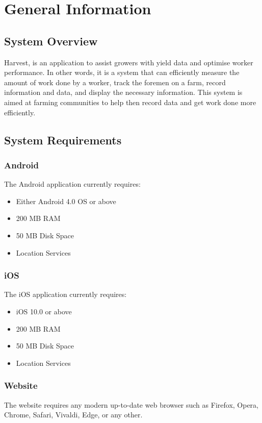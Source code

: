 \documentclass[11pt]{article}
\begin{document}
\newpage
{}
\tableofcontents
\newpage
\listoffigures

\newpage
{}

\section{General Information}
\subsection{System Overview}
Harvest, is an application to assist growers with yield data and optimise worker performance. In other words, it is a system that can efficiently measure the amount of work done by a worker, track the foremen on a farm, record information and data, and display the necessary information. This system is aimed at farming communities to help then record data and get work done more efficiently.

\subsection{System Requirements}
\subsubsection{Android}
The Android application currently requires:
\begin{itemize}
	\item Either Android 4.0 OS or above
\item 200 MB RAM
\item 50 MB Disk Space	
	\item Location Services
\end{itemize}
\subsubsection{iOS}
The iOS application currently requires:
\begin{itemize}
	\item iOS 10.0 or above
\item 200 MB RAM
\item 50 MB Disk Space	
	\item Location Services
\end{itemize}
\subsubsection{Website}
The website requires any modern up-to-date web browser such as Firefox, Opera, Chrome, Safari, Vivaldi, Edge, or any other.
\end{document}
